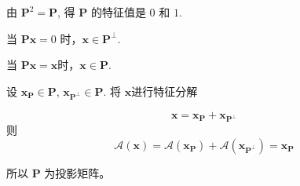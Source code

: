 \documentclass[11pt,letter,notitlepage]{article}
\begin{document}
\begin{solution}
\begin{enumerate}
\begin{enumerate}
\begin{enumerate}
				                  由 $\mathbf{P}^2=\mathbf{P}$, 得 $\mathbf{P}$ 的特征值是 $0$ 和 $1$.

				                  当 $\mathbf{P}\mathbf{x}=0$ 时，$\mathbf{x}\in \mathbf{P}^\bot$.

				                  当 $\mathbf{P}\mathbf{x}=\mathbf{x}$时，$\mathbf{x}\in\mathbf{P}$.

				                  设 $\mathbf{x}_{\mathbf{P}}\in\mathbf{P}$, $\mathbf{x}_{\mathbf{P}^\bot}\in\mathbf{P}$. 将 $\mathbf{x}$进行特征分解

				                  $$\mathbf{x}=\mathbf{x}_{\mathbf{P}}+\mathbf{x}_{\mathbf{P}^\bot}$$
				                  则
				                  $$\mathcal{A}(\mathbf{x})=\mathcal{A}(\mathbf{x}_{\mathbf{P}})+\mathcal{A}(\mathbf{x}_{\mathbf{P}^\bot})=\mathbf{x}_{\mathbf{P}}$$

				                  所以 $\mathbf{P}$ 为投影矩阵。



\end{enumerate}
\end{enumerate}
\end{enumerate}
\end{solution}
\end{document}

